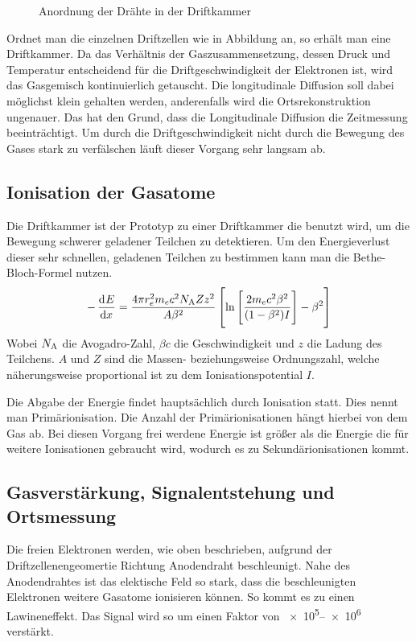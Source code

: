 \documentclass[11pt, ngerman, fleqn, DIV=15, headinclude, BCOR=2cm]{scrreprt}
\begin{document}
\begin{figure}
	\centering
	\caption{%
		Anordnung der Drähte in der Driftkammer
	}
	\label{fig:aufbau_driftkammer}
\end{figure}

Ordnet man die einzelnen Driftzellen wie in Abbildung \fehlt an, so erhält man 
eine Driftkammer.
Da das Verhältnis der Gaszusammensetzung, dessen Druck und Temperatur
entscheidend für die Driftgeschwindigkeit der Elektronen ist, wird das Gasgemisch kontinuierlich getauscht. 
Die longitudinale Diffusion soll dabei möglichst klein gehalten werden,
anderenfalls wird die Ortsrekonstruktion ungenauer.
Das hat den Grund, dass die Longitudinale Diffusion die Zeitmessung beeinträchtigt.
Um durch die Driftgeschwindigkeit nicht durch die Bewegung des Gases stark zu verfälschen läuft dieser Vorgang sehr langsam ab.

\subsection{Ionisation der Gasatome}
Die Driftkammer ist der Prototyp zu einer Driftkammer die benutzt wird, um
die Bewegung schwerer geladener Teilchen zu detektieren.
Um den Energieverlust dieser sehr schnellen, geladenen Teilchen zu bestimmen kann man die Bethe-Bloch-Formel nutzen.
\[
    -\dod Ex = \frac{4 \pi r^2_e m_e c^2 N_\text{A} Z z^2}{A \beta^2}\sbr{\ln\sbr{\frac{2m_e c^2 \beta^2}{(1-\beta^2)I}}-\beta^2}
\]
Wobei $N_\text A$ die Avogadro-Zahl, $\beta c$ die Geschwindigkeit und $z$ die Ladung des Teilchens. $A$ und $Z$ sind die Massen- beziehungsweise Ordnungszahl, welche näherungsweise proportional ist zu dem Ionisationspotential $I$.

Die Abgabe der Energie findet hauptsächlich durch Ionisation statt.
Dies nennt man Primärionisation.
Die Anzahl der Primärionisationen hängt hierbei von dem Gas ab.
Bei diesen Vorgang frei werdene Energie ist größer als die Energie die für weitere Ionisationen gebraucht wird, wodurch es zu Sekundärionisationen kommt.

\subsection{Gasverstärkung, Signalentstehung und Ortsmessung}
Die freien Elektronen werden, wie oben beschrieben, aufgrund der Driftzellenengeomertie Richtung Anodendraht beschleunigt. 
Nahe des Anodendrahtes ist das elektische Feld so stark, dass die beschleunigten Elektronen weitere Gasatome ionisieren können.
So kommt es zu einen Lawineneffekt.
Das Signal wird so um einen Faktor von \numrange{e5}{e6} verstärkt.
\end{document}
